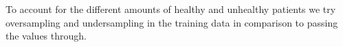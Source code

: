To account for the different amounts of healthy and unhealthy patients we try oversampling and undersampling in the training data in comparison to passing the values through.


